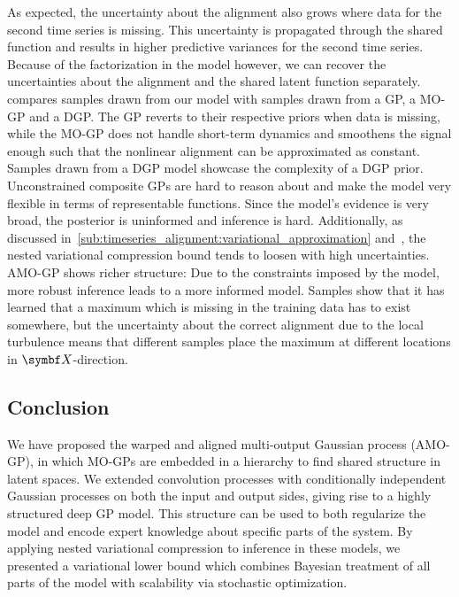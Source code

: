 As expected, the uncertainty about the alignment also grows where data for the second time series is missing.
This uncertainty is propagated through the shared function and results in higher predictive variances for the second time series.
Because of the factorization in the model however, we can recover the uncertainties about the alignment and the shared latent function separately.
 compares samples drawn from our model with samples drawn from a GP, a MO-GP and a DGP.
The GP reverts to their respective priors when data is missing, while the MO-GP does not handle short-term dynamics and smoothens the signal enough such that the nonlinear alignment can be approximated as constant.
Samples drawn from a DGP model showcase the complexity of a DGP prior.
Unconstrained composite GPs are hard to reason about and make the model very flexible in terms of representable functions.
Since the model's evidence is very broad, the posterior is uninformed and inference is hard.
Additionally, as discussed in~\cref{sub:timeseries_alignment:variational_approximation} and~\parencite{hensman_nested_2014}, the nested variational compression bound tends to loosen with high uncertainties.
AMO-GP shows richer structure:
Due to the constraints imposed by the model, more robust inference leads to a more informed model.
Samples show that it has learned that a maximum which is missing in the training data has to exist somewhere, but the uncertainty about the correct alignment due to the local turbulence means that different samples place the maximum at different locations in $\mat{X}$-direction.


\subsection{Conclusion}
\label{sub:timeseries_alignment:conclusion}
We have proposed the warped and aligned multi-output Gaussian process (AMO-GP), in which MO-GPs are embedded in a hierarchy to find shared structure in latent spaces.
We extended convolution processes \parencite{boyle_dependent_2004} with conditionally independent Gaussian processes on both the input and output sides, giving rise to a highly structured deep GP model.
This structure can be used to both regularize the model and encode expert knowledge about specific parts of the system.
By applying nested variational compression \parencite{hensman_nested_2014} to inference in these models, we presented a variational lower bound which combines Bayesian treatment of all parts of the model with scalability via stochastic optimization.

